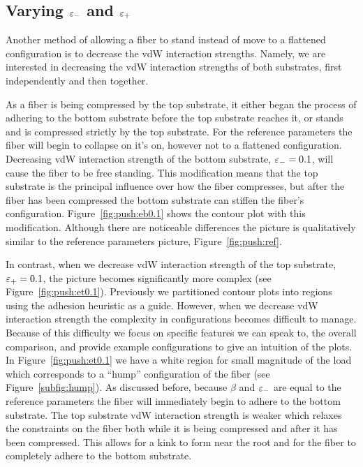 \subsection{Varying $\varepsilon_-$ and $\varepsilon_+$} \label{subsection:push:eps}

Another method of allowing a fiber to stand instead of move to a flattened configuration is to decrease the vdW interaction strengths. Namely, we are interested in decreasing the vdW interaction strengths of both substrates, first independently and then together.

As a fiber is being compressed by the top substrate, it either began the process of adhering to the bottom substrate before the top substrate reaches it, or stands and is compressed strictly by the top substrate. For the reference parameters the fiber will begin to collapse on it's on, however not to a flattened configuration. Decreasing vdW interaction strength of the bottom substrate, $\varepsilon_-=0.1$, will cause the fiber to be free standing. This modification means that the top substrate is the principal influence over how the fiber compresses, but after the fiber has been compressed the bottom substrate can stiffen the fiber's configuration. Figure~\ref{fig:push:eb0.1} shows the contour plot with this modification. Although there are noticeable differences the picture is qualitatively similar to the reference parameters picture, Figure~\ref{fig:push:ref}.

In contrast, when we decrease vdW interaction strength of the top substrate, $\varepsilon_+=0.1$, the picture becomes significantly more complex (see Figure~\ref{fig:push:et0.1}). Previously we partitioned contour plots into regions using the adhesion heuristic as a guide. However, when we decrease vdW interaction strength the complexity in configurations becomes difficult to manage. Because of this difficulty we focus on specific features we can speak to, the overall comparison, and provide example configurations to give an intuition of the plots. In Figure~\ref{fig:push:et0.1} we have a white region for small magnitude of the load which corresponds to a ``hump'' configuration of the fiber (see Figure~\ref{subfig:hump}). As discussed before, because $\beta$ and $\varepsilon_-$ are equal to the reference parameters the fiber will immediately begin to adhere to the bottom substrate. The top substrate vdW interaction strength is weaker which relaxes the constraints on the fiber both while it is being compressed and after it has been compressed. This allows for a kink to form near the root and for the fiber to completely adhere to the bottom substrate.

